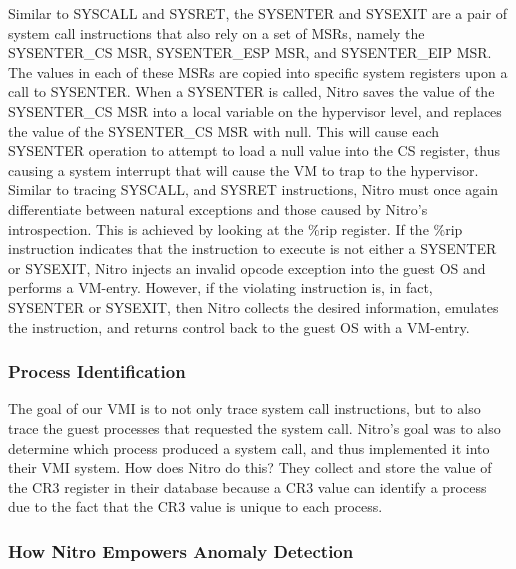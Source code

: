 \documentclass{report}
\begin{document}
\begin{spacing}{1.5}
{\large
\leavevmode\newline
\leavevmode\newline
Similar to SYSCALL and SYSRET, the SYSENTER and SYSEXIT are a pair of system call instructions that also rely on a set of MSRs, namely the SYSENTER\_CS MSR, SYSENTER\_ESP MSR, and SYSENTER\_EIP MSR. The values in each of these MSRs are copied into specific system registers upon a call to SYSENTER. When a SYSENTER is called, Nitro saves the value of the SYSENTER\_CS MSR into a local variable on the hypervisor level, and replaces the value of the SYSENTER\_CS MSR with null. This will cause each SYSENTER operation to attempt to load a null value into the CS register, thus causing a system interrupt that will cause the VM to trap to the hypervisor. Similar to tracing SYSCALL, and SYSRET instructions, Nitro must once again differentiate between natural exceptions and those caused by Nitro's introspection. This is achieved by looking at the \%rip register. If the \%rip instruction indicates that the instruction to execute is not either a SYSENTER or SYSEXIT, Nitro injects an invalid opcode exception into the guest OS and performs a VM-entry. However, if the violating instruction is, in fact, SYSENTER or SYSEXIT, then Nitro collects the desired information, emulates the instruction, and returns control back to the guest OS with a VM-entry.
\leavevmode\newline
}


\subsubsection{Process Identification}

{\large
\leavevmode\newline
The goal of our VMI is to not only trace system call instructions, but to also trace the guest processes that requested the system call. Nitro's goal was to also determine which process produced a system call, and thus implemented it into their VMI system. How does Nitro do this? They collect and store the value of the CR3 register in their database because a CR3 value can identify a process due to the fact that the CR3 value is unique to each process.  
\leavevmode\newline
}


\subsubsection{How Nitro Empowers Anomaly Detection}


\end{spacing}
\end{document}
